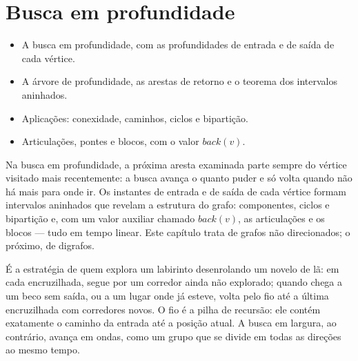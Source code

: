 \chapter{Busca em profundidade}\label{cap:dfs}\label{sec:dfs}
\begin{objetivos}
\begin{itemize}
  \item A busca em profundidade, com as profundidades de entrada e de saída de cada vértice.
  \item A árvore de profundidade, as arestas de retorno e o teorema dos intervalos aninhados.
  \item Aplicações: conexidade, caminhos, ciclos e bipartição.
  \item Articulações, pontes e blocos, com o valor $back(v)$.
\end{itemize}
\end{objetivos}

Na busca em profundidade, a próxima aresta examinada parte sempre do vértice visitado mais recentemente: a busca avança o quanto puder e só volta quando não há mais para onde ir. Os instantes de entrada e de saída de cada vértice formam intervalos aninhados que revelam a estrutura do grafo: componentes, ciclos e bipartição e, com um valor auxiliar chamado $back(v)$, as articulações e os blocos --- tudo em tempo linear. Este capítulo trata de grafos não direcionados; o próximo, de digrafos.

\begin{intuicao}
É a estratégia de quem explora um labirinto desenrolando um novelo de lã: em cada encruzilhada, segue por um corredor ainda não explorado; quando chega a um beco sem saída, ou a um lugar onde já esteve, volta pelo fio até a última encruzilhada com corredores novos. O fio é a pilha de recursão: ele contém exatamente o caminho da entrada até a posição atual. A busca em largura, ao contrário, avança em ondas, como um grupo que se divide em todas as direções ao mesmo tempo.
\end{intuicao}

